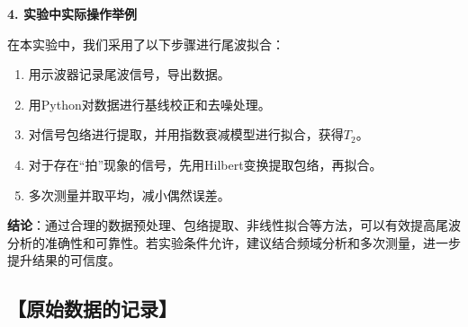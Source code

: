 \documentclass[12pt,a4paper,UTF8]{ctexart}
\begin{document}
\textbf{4. 实验中实际操作举例}

在本实验中，我们采用了以下步骤进行尾波拟合：
\begin{enumerate}
    \item 用示波器记录尾波信号，导出数据。
    \item 用Python对数据进行基线校正和去噪处理。
    \item 对信号包络进行提取，并用指数衰减模型进行拟合，获得$T_2$。
    \item 对于存在“拍”现象的信号，先用Hilbert变换提取包络，再拟合。
    \item 多次测量并取平均，减小偶然误差。
\end{enumerate}

\textbf{结论}：通过合理的数据预处理、包络提取、非线性拟合等方法，可以有效提高尾波分析的准确性和可靠性。若实验条件允许，建议结合频域分析和多次测量，进一步提升结果的可信度。




\subsection*{【原始数据的记录】}

\end{document}

